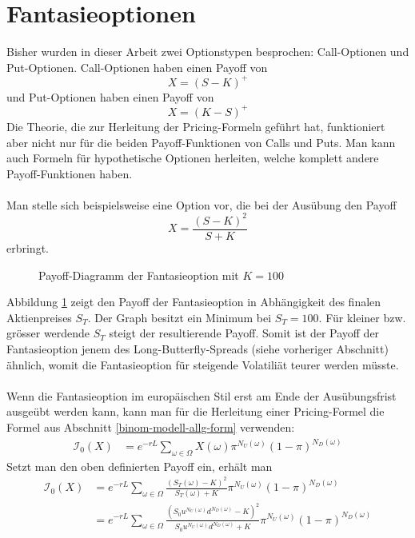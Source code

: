 \documentclass[11pt]{report} %
\begin{document}
\section{Fantasieoptionen}
Bisher wurden in dieser Arbeit zwei Optionstypen besprochen: Call-Optionen und Put-Optionen. Call-Optionen haben einen Payoff von $$X=(S-K)^+$$und Put-Optionen haben einen Payoff von $$X=(K-S)^+$$ Die Theorie, die zur Herleitung der Pricing-Formeln geführt hat, funktioniert aber nicht nur für die beiden Payoff-Funktionen von Calls und Puts. Man kann auch Formeln für hypothetische Optionen herleiten, welche komplett andere Payoff-Funktionen haben.\\\\
Man stelle sich beispielsweise eine Option vor, die bei der Ausübung den Payoff $$X=\frac{(S-K)^2}{S+K}$$ erbringt.
\begin{figure}[H]
    \centering
    \caption{Payoff-Diagramm der Fantasieoption mit $K=100$}
    \label{fig:payoff-fant}
\end{figure}
Abbildung \ref{fig:payoff-fant} zeigt den Payoff der Fantasieoption in Abhängigkeit des finalen Aktienpreises $S_T$. Der Graph besitzt ein Minimum bei $S_T=100$. Für kleiner bzw. grösser werdende $S_T$ 
 steigt der resultierende Payoff. Somit ist der Payoff der Fantasieoption jenem des Long-Butterfly-Spreads (siehe vorheriger Abschnitt) ähnlich, womit die Fantasieoption für steigende Volatiliät teurer werden müsste.\\\\Wenn die Fantasieoption im europäischen Stil erst am Ende der Ausübungsfrist ausgeübt werden kann, kann man für die Herleitung einer Pricing-Formel die Formel aus Abschnitt \ref{binom-modell-allg-form} verwenden:
\begin{align*}
    \mathcal{I}_0(X)&=e^{-rL}\sum_{\omega \in \Omega}X(\omega)\pi^{N_U(\omega)}(1-\pi)^{N_D(\omega)}
\end{align*}
Setzt man den oben definierten Payoff ein, erhält man
\begin{align*}
    \mathcal{I}_0(X)&=e^{-rL}\sum_{\omega \in \Omega}\frac{(S_T(\omega)-K)^2}{S_T(\omega)+K}\pi^{N_U(\omega)}(1-\pi)^{N_D(\omega)}\\
    &=e^{-rL}\sum_{\omega \in \Omega}\frac{(S_0u^{N_U(\omega)}d^{N_D(\omega)}-K)^2}{S_0u^{N_U(\omega)}d^{N_D(\omega)}+K}\pi^{N_U(\omega)}(1-\pi)^{N_D(\omega)}
\end{align*}
\end{document}
